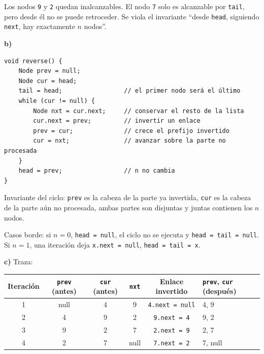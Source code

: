 \documentclass[11pt,a4paper]{article}
\newcommand{\chain}[3]{%
\foreach \v [count=\i] in {#1} {
  \node[ln] (c\i) at (\i*#3,0) {\v};
  \ifnum\i>1 \pgfmathtruncatemacro{\p}{\i-1}\draw[#2] (c\p) -- (c\i);\fi
}}
\begin{document}
Los nodos \texttt{9} y \texttt{2} quedan inalcanzables. El nodo \texttt{7} solo es alcanzable por \texttt{tail}, pero desde él no se puede retroceder. Se viola el invariante ``desde \texttt{head}, siguiendo \texttt{next}, hay exactamente $n$ nodos''.

\textbf{b)}
\begin{lstlisting}
void reverse() {
    Node prev = null;
    Node cur = head;
    tail = head;                 // el primer nodo será el último
    while (cur != null) {
        Node nxt = cur.next;     // conservar el resto de la lista
        cur.next = prev;         // invertir un enlace
        prev = cur;              // crece el prefijo invertido
        cur = nxt;               // avanzar sobre la parte no procesada
    }
    head = prev;                 // n no cambia
}
\end{lstlisting}

Invariante del ciclo: \texttt{prev} es la cabeza de la parte ya invertida, \texttt{cur} es la cabeza de la parte aún no procesada, ambas partes son disjuntas y juntas contienen los $n$ nodos.

Casos borde: si $n = 0$, \texttt{head = null}, el ciclo no se ejecuta y \texttt{head = tail = null}. Si $n = 1$, una iteración deja \texttt{x.next = null}, \texttt{head = tail = x}.

\textbf{c)} Traza:

\begin{center}
\small
\begin{tabular}{cccccl}
\toprule
Iteración & \texttt{prev} (antes) & \texttt{cur} (antes) & \texttt{nxt} & Enlace invertido & \texttt{prev}, \texttt{cur} (después) \\
\midrule
1 & null & 4 & 9 & \texttt{4.next = null} & 4, 9 \\
2 & 4 & 9 & 2 & \texttt{9.next = 4} & 9, 2 \\
3 & 9 & 2 & 7 & \texttt{2.next = 9} & 2, 7 \\
4 & 2 & 7 & null & \texttt{7.next = 2} & 7, null \\
\bottomrule
\end{tabular}
\end{center}

\begin{center}
\end{center}
\end{document}
